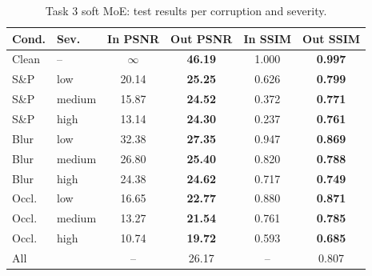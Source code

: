 \begin{table}[t]\centering\caption{Task 3 soft MoE: test results per corruption and severity.}\label{tab:t3}
\setlength{\tabcolsep}{4pt}\begin{tabular}{llcccc}\toprule
Cond. & Sev. & In PSNR & Out PSNR & In SSIM & Out SSIM\\\midrule
Clean & -- & $\infty$ & \textbf{46.19} & 1.000 & \textbf{0.997}\\
S\&P & low & 20.14 & \textbf{25.25} & 0.626 & \textbf{0.799}\\
S\&P & medium & 15.87 & \textbf{24.52} & 0.372 & \textbf{0.771}\\
S\&P & high & 13.14 & \textbf{24.30} & 0.237 & \textbf{0.761}\\
Blur & low & 32.38 & \textbf{27.35} & 0.947 & \textbf{0.869}\\
Blur & medium & 26.80 & \textbf{25.40} & 0.820 & \textbf{0.788}\\
Blur & high & 24.38 & \textbf{24.62} & 0.717 & \textbf{0.749}\\
Occl. & low & 16.65 & \textbf{22.77} & 0.880 & \textbf{0.871}\\
Occl. & medium & 13.27 & \textbf{21.54} & 0.761 & \textbf{0.785}\\
Occl. & high & 10.74 & \textbf{19.72} & 0.593 & \textbf{0.685}\\
\midrule All & & -- & 26.17 & -- & 0.807\\
\bottomrule\end{tabular}\end{table}